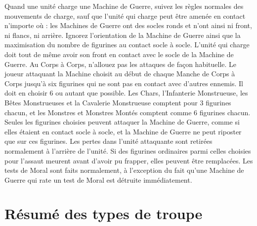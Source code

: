 Quand une unité charge une Machine de Guerre, suivez les règles normales des mouvements de charge, sauf que l'unité qui charge peut être amenée en contact n'importe où : les Machines de Guerre ont des socles ronds et n'ont ainsi ni front, ni flancs, ni arrière. Ignorez l'orientation de la Machine de Guerre ainsi que la maximisation du nombre de figurines au contact socle à socle. L'unité qui charge doit tout de même avoir son front en contact avec le socle de la Machine de Guerre.  Au Corps à Corps, n'allouez pas les attaques de façon habituelle. Le joueur attaquant la Machine choisit au début de chaque Manche de Corps à Corps jusqu'à six figurines qui ne sont pas en contact avec d'autres ennemis. Il doit en choisir 6 ou autant que possible. Les Chars, l'Infanterie Monstrueuse, les Bêtes Monstrueuses et la Cavalerie Monstrueuse comptent pour 3 figurines chacun, et les Monstres et Monstres Montés comptent comme 6 figurines chacun. Seules les figurines choisies peuvent attaquer la Machine de Guerre, comme si elles étaient en contact socle à socle, et la Machine de Guerre ne peut riposter que sur ces figurines. Les pertes dans l'unité attaquante sont retirées normalement à l'arrière de l'unité. Si des figurines ordinaires parmi celles choisies pour l'assaut meurent avant d'avoir pu frapper, elles peuvent être remplacées. Les tests de Moral sont faits normalement, à l'exception du fait qu'une Machine de Guerre qui rate un test de Moral est détruite immédiatement.

\newpage
\section*{Résumé des types de troupe}

